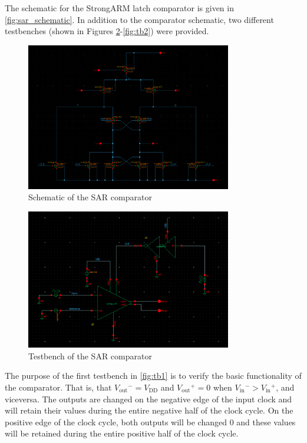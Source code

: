 \documentclass{article}
\newcommand*{\subb}[1]{\ensuremath{_{\mathrm{#1}}}}
\begin{document}
 \noindent The schematic for the StrongARM latch comparator is given in \autoref{fig:sar_schematic}.
 In addition to the comparator schematic, two different testbenches (shown in Figures \ref{fig:tb1}-\ref{fig:tb2}) were provided.

 \begin{figure}[!h]
  \centering
  \includegraphics[width=0.8\textwidth]{img/sch}
  \caption{Schematic of the SAR comparator}
  \label{fig:sar_schematic}
 \end{figure}
 
 \begin{figure}[!h]
  \centering
  \includegraphics[width=0.8\textwidth]{img/tb1}
  \caption{Testbench of the SAR comparator}
  \label{fig:tb1}
 \end{figure}

 The purpose of the first testbench in \autoref{fig:tb1} is to verify the basic functionality of the comparator. That is, that $V\subb{out}^-=V\subb{DD}$ and $V\subb{out}^+=0$ when $V\subb{in}^->V\subb{in}^+$, and viceversa. The outputs are changed on the negative edge of the input clock and will retain their values during the entire negative half of the clock cycle. On the positive edge of the clock cycle, both outputs will be changed 0 and these values will be retained during the entire positive half of the clock cycle.
\end{document}

